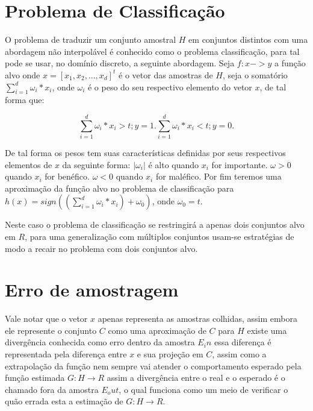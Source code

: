 \documentclass[pfc]{imetex}
\begin{document}
\section{Problema de Classificação}

    O problema de traduzir um conjunto amostral $H$ em conjuntos distintos com uma abordagem não interpolável é conhecido como o problema classificação, para tal pode se usar, no domínio discreto, a seguinte abordagem. Seja $f: x->y$ a função alvo onde $x = [x_1,x_2,...,x_d]^t$ é o vetor das amostras de $H$, seja o somatório $\sum\limits_{i=1}^d \omega_i*x_i$, onde $\omega_i$ é o peso do seu respectivo elemento do vetor $x$, de tal forma que:

    \begin{equation}
        \sum\limits_{i=1}^d \omega_i*x_i>t; y = 1.
        \sum\limits_{i=1}^d \omega_i*x_i<t; y = 0.
    \end{equation}

    De tal forma os pesos tem suas características definidas por seus respectivos elementos de $x$ da seguinte forma:\newline
    $|\omega_i|$ é alto quando $x_i$ for importante.\newline
    $\omega > 0$ quando $x_i$ for benéfico.\newline
    $\omega < 0$ quando $x_i$ for maléfico.\newline
    Por fim teremos uma aproximação da função alvo no problema de classificação para $h(x) = sign((\sum\limits_{i=1}^d \omega_i*x_i)+\omega_0)$, onde $\omega_0 = t$.

    Neste caso o problema de classificação se restringirá a apenas dois conjuntos alvo em $R$, para uma generalização com múltiplos conjuntos usam-se estratégias de modo a recair no problema com dois conjuntos alvo.

\section{Erro de amostragem}

    Vale notar que o vetor $x$ apenas representa as amostras colhidas, assim embora ele represente o conjunto $C$ como uma aproximação de $C$ para $H$ existe uma divergência conhecida como erro dentro da amostra $E_in$ essa diferença é representada pela diferença entre $x$ e sua projeção em $C$, assim como a extrapolação da função nem sempre vai atender o comportamento esperado pela função estimada $G: H \rightarrow R$ assim a divergência entre o real e o esperado é o chamado fora da amostra $E_out$, o qual funciona como um meio de verificar o quão errada esta a estimação de $G: H \rightarrow R$.
\end{document}
